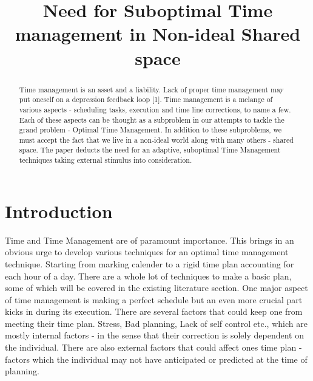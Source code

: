 \documentclass[conference]{IEEEtran}
\begin{document}
%
\title{Need for Suboptimal Time management in Non-ideal Shared space}


\author{
}

\maketitle


\begin{abstract}
Time management is an asset and a liability. Lack of proper time management may put oneself on a depression feedback loop [1]. Time management is a melange of various aspects - scheduling tasks, execution and time line corrections, to name a few. Each of these aspects can be thought as a subproblem in our attempts to tackle the grand problem - Optimal Time Management. In addition to these subproblems, we must accept the fact that we live in a non-ideal world along with many others - shared space.  The paper deducts the need for an adaptive, suboptimal Time Management techniques taking external stimulus into consideration.
\end{abstract}


%
\IEEEpeerreviewmaketitle


\section{Introduction}
Time and Time Management are of paramount importance. This brings in an obvious urge to develop various techniques for an optimal time management technique. Starting from marking calender to a rigid time plan accounting for each hour of a day. There are a whole lot of techniques to make a basic plan, some of which will be covered in the existing literature section. One major aspect of time management is making a perfect schedule but an even more crucial part kicks in during its execution. There are several factors that could keep one from meeting their time plan. Stress, Bad planning, Lack of self control etc., which are mostly internal factors - in the sense that their correction is solely dependent on the individual. There are also external factors that could affect ones time plan - factors which the individual may not have anticipated or predicted at the time of planning.
\end{document}
